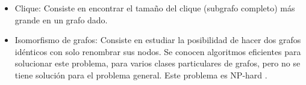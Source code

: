 \begin{itemize}
	\item Clique: Consiste en encontrar el tamaño del clique (subgrafo completo) más grande en un grafo dado.
	
	\item Isomorfismo de grafos: Consiste en estudiar la posibilidad de hacer dos grafos idénticos con solo renombrar sus nodos. Se conocen algoritmos eficientes para solucionar este problema, para varios clases particulares de grafos, pero no se tiene solución para el problema general. Este problema es NP-hard .
\end{itemize}